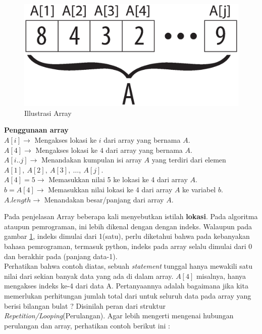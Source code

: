 	\begin{figure}[h!]%
		\Centering
		\includegraphics[scale=0.4]{fig/Array.eps}%
		\caption{Illustrasi Array}%
		\label{fig:illustrasiArray}%
	\end{figure}

	\textbf{Penggunaan array}\\
	$A[i] \rightarrow$ Mengakses lokasi ke $i$ dari array yang bernama $A$.\\
	$A[4] \rightarrow$ Mengakses lokasi ke $4$ dari array yang bernama $A$.\\
	$A[i..j] \rightarrow$ Menandakan kumpulan isi array $A$ yang terdiri dari elemen $A[1],\ A[2],\ A[3],\ \ldots,\ A[j]$.\\
	$A[4] = 5 \rightarrow$ Memasukkan nilai 5 ke lokasi ke 4 dari array $A$.\\
	$b = A[4] \rightarrow$ Memasukkan nilai lokasi ke 4 dari array $A$ ke variabel $b$. \\
	$A.length \rightarrow$ Menandakan besar/panjang dari array $A$. \\

	
Pada penjelasan Array beberapa kali menyebutkan istilah \textbf{lokasi}. Pada algoritma ataupun pemrograman, ini lebih dikenal dengan dengan indeks. Walaupun pada gambar \ref{fig:illustrasiArray}, indeks dimulai dari 1(satu), perlu diketahui bahwa pada kebanyakan bahasa pemrograman, termasuk python, indeks pada array selalu dimulai dari 0 dan berakhir pada (panjang data-1). \\

Perhatikan bahwa contoh  diatas, sebuah \textit{statement} tunggal hanya mewakili satu nilai dari sekian banyak data yang ada di dalam array. $A[4]$ misalnya, hanya mengakses indeks ke-4 dari data A. Pertanyaannya adalah bagaimana jika kita memerlukan perhitungan jumlah total dari untuk seluruh data pada array yang berisi bilangan bulat ? Disinilah peran dari struktur \textit{Repetition/Looping}(Perulangan). Agar lebih mengerti mengenai hubungan perulangan dan array, perhatikan contoh berikut ini : 

